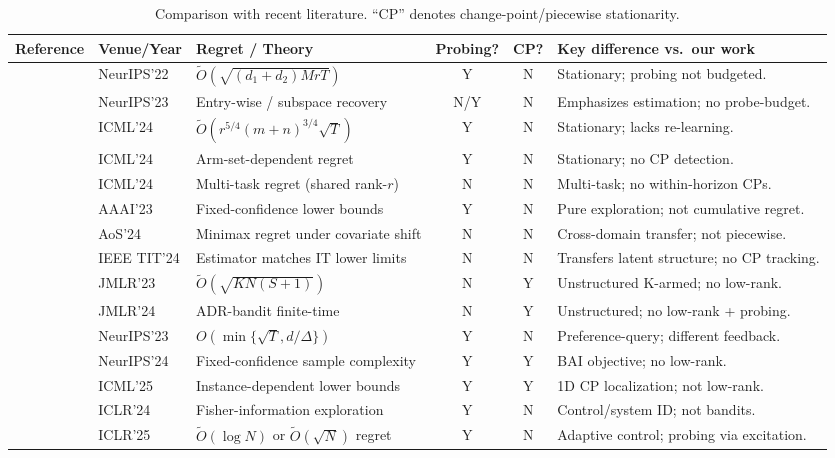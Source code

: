 \documentclass{article}
\begin{document}
\begin{table}[!htpb]
\centering
\small
\setlength{\tabcolsep}{4pt}
\renewcommand{\arraystretch}{1.15}
\begin{tabular}{p{3.2cm} p{1.5cm} p{4.8cm} c c p{4.9cm}}
\toprule
\textbf{Reference} & \textbf{Venue/Year} & \textbf{Regret / Theory} & \textbf{Probing?} & \textbf{CP?} & \textbf{Key difference vs.\ our work} \\
\midrule
\cite{kang2022gestt} & NeurIPS'22 & $\tilde O(\sqrt{(d_1+d_2)MrT})$ & Y & N & Stationary; probing not budgeted. \\
\cite{stojanovic2023spectral} & NeurIPS'23 & Entry-wise / subspace recovery & N/Y & N & Emphasizes estimation; no probe-budget. \\
\cite{pmlr-v235-jedra24a} & ICML'24 & $\tilde O(r^{5/4}(m+n)^{3/4}\sqrt{T})$ & Y & N & Stationary; lacks re-learning. \\
\cite{pmlr-v235-jang24e} & ICML'24 & Arm-set-dependent regret & Y & N & Stationary; no CP detection. \\
\cite{pmlr-v235-lin24o} & ICML'24 & Multi-task regret (shared rank-$r$) & N & N & Multi-task; no within-horizon CPs. \\
\cite{russo2023globalLocal} & AAAI'23 & Fixed-confidence lower bounds & Y & N & Pure exploration; not cumulative regret. \\
\cite{cai2024transfer} & AoS'24 & Minimax regret under covariate shift & N & N & Cross-domain transfer; not piecewise. \\
\cite{park2024latentcontinuity} & IEEE TIT'24 & Estimator matches IT lower limits & N & N & Transfers latent structure; no CP tracking. \\
\cite{abbasi2023dynamic} & JMLR'23 & $\tilde O(\sqrt{KN(S+1)})$ & N & Y & Unstructured K-armed; no low-rank. \\
\cite{komiyama2024adr} & JMLR'24 & ADR-bandit finite-time & N & Y & Unstructured; no low-rank + probing. \\
\cite{sekhari2023aurora} & NeurIPS'23 & $O(\min\{\sqrt{T}, d/\Delta\})$ & Y & N & Preference-query; different feedback. \\
\cite{hou2024pslb} & NeurIPS'24 & Fixed-confidence sample complexity & Y & Y & BAI objective; no low-rank. \\
\cite{pmlr-v267-lazzaro25a} & ICML'25 & Instance-dependent lower bounds & Y & Y & 1D CP localization; not low-rank. \\
\cite{memmel2024asid} & ICLR'24 & Fisher-information exploration & Y & N & Control/system ID; not bandits. \\
\cite{xu2025leqr} & ICLR'25 & $\tilde O(\log N)$ or $\tilde O(\sqrt{N})$ regret & Y & N & Adaptive control; probing via excitation. \\
\bottomrule
\end{tabular}
\caption{Comparison with recent literature. ``CP'' denotes change-point/piecewise stationarity.}
\label{tab:related_work_summary}
\end{table}
\end{document}
